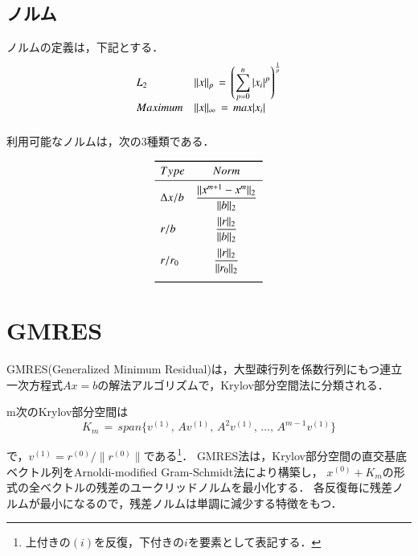 %
\subsection{ノルム}
ノルムの定義は，下記とする．
\begin{equation}
\begin{array}{ll}
L_2 &
\displaystyle{ \| x \|_p \,=\, 
\left( \sum_{p=0}^n {|x_i|^p} \right)^{\frac{1}{p}}
}\\
\vspace{2mm}
Maximum & \| x \|_{\infty} \,=\, max|x_i|\\
\end{array}
\label{eq:def_norm}
\end{equation}

利用可能なノルムは，次の3種類である．

\begin{equation}
\begin{array}{lc} \toprule
Type & Norm \\ \midrule
\vspace{2mm}
\Delta x / b & \displaystyle{ \frac{\|x^{m+1}-x^m \|_2}{\|b\|_2} } \\ 
\vspace{2mm}
r/b & \displaystyle{ \frac{\| r \|_2}{\|b\|_2} } \\ 
\vspace{2mm}
r/r_0 & \displaystyle{ \frac{\|r\|_2}{\|r_0\|_2} } \\  \bottomrule
\end{array}
\label{eq:iter_norm}
\end{equation}






%
\section{GMRES}

GMRES(Generalized Minimum Residual)は，大型疎行列を係数行列にもつ連立一次方程式$A x = b$の解法アルゴリズムで，Krylov部分空間法に分類される．


m次のKrylov部分空間は
\begin{equation}
\displaystyle{ K_m \,=\, span \{ v^{(1)},\, Av^{(1)},\, A^2 v^{(1)},\, ...,\, A^{m-1} v^{(1)} \} }
\label{eq:subspace}
\end{equation}

\noindent で，$v^{(1)}=r^{(0)}/\|r^{(0)}\|$である\footnote{上付きの$(i)$を反復，下付きの$i$を要素として表記する．}．
GMRES法は，Krylov部分空間の直交基底ベクトル列をArnoldi-modified Gram-Schmidt法により構築し，
$x^{(0)}+K_m$の形式の全ベクトルの残差のユークリッドノルムを最小化する．
各反復毎に残差ノルムが最小になるので，残差ノルムは単調に減少する特徴をもつ．

